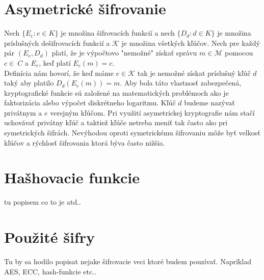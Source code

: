 \section{Asymetrické šifrovanie}
	Nech $\{E_e : e \in K\}$ je množina šifrovacích funkcií a nech  $\{D_d : d \in K\}$ je množina príslušných dešifrovacích funkcií a $\mathcal K$ je množina všetkých kľúčov. Nech pre každý pár $(E_e,D_d)$ platí, že je výpočtovo "nemožné" získať správu $m \in\mathcal M$ pomocou $c \in\	 C$ a $E_e$, keď platí $E_e(m) = c$. 
	\\Definícia nám hovorí, že keď máme $e \in\mathcal K$ tak je nemožné získat príslušný kľúč $d$ taký aby platilo $D_d(E_e(m)) = m$. Aby bola táto vlastnosť zabezpečená,  kryptografické funkcie sú založené na matematických problémoch ako je faktorizácia alebo výpočet diskrétneho logaritmu. Kľúč $d$ budeme nazývať privátnym a $e$ verejným kľúčom. Pri využití asymetrickej kryptografie nám stačí uchovávať privátny kľúč a taktiež kľúče netreba meniť tak často ako pri symetrických šifrách. Nevýhodou oproti symetrickému šifrovaniu môže byť velkosť kľúčov a rýchlosť šifrovania ktorá býva často nižšia.	
	
\section{Hašhovacie funkcie}
	tu popisem co to je atd..

\section{Použité šifry}
	Tu by sa hodilo popisat nejake šifrovacie veci ktoré budem pouzívať. Napríklad AES, ECC, hash-funkcie etc..
		